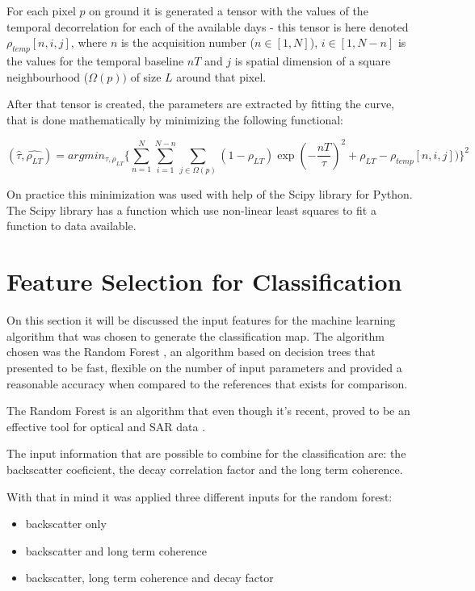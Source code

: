 For each pixel $p$ on ground it is generated a tensor with the values of the temporal decorrelation for each of the available days - this tensor is here denoted $\rho_{temp} [n, i, j]$, where $n$ is the acquisition number ($n \in [1, N]$), $i \in [1, N-n]$ is the values for the temporal baseline $nT$ and $j$ is spatial dimension of a square neighbourhood ($\Omega(p))$ of size $L$ around that pixel.

After that tensor is created, the parameters are extracted by fitting the curve, that is done mathematically by minimizing the following functional:

\begin{equation}
    (\hat{\tau}, \hat{\rho_{LT}}) = arg min_{\tau, \rho_{LT}} \{
    \sum_{n=1}^N
    \sum_{i=1}^{N-n}
    \sum_{j \in \Omega(p)}
    (1-\rho_{LT}) \exp(-\frac{nT}{\tau})^2 + \rho_{LT} - \rho_{temp}[n,i,j]) 
    \}^2
\end{equation}

On practice this minimization was used with help of the Scipy library for Python. The Scipy library has a function which use non-linear least squares to fit a function to data available. 
\section{Feature Selection for Classification}
\label{tresponto4}

On this section it will be discussed the input features for the machine learning algorithm that was chosen to generate the classification map. The algorithm chosen was the Random Forest \cite{rf}, an algorithm based on decision trees that presented to be fast, flexible on the number of input parameters and provided a reasonable accuracy when compared to the references that exists for comparison. 

The Random Forest is an algorithm that even though it's recent, proved to be an effective tool for optical and SAR data \cite{rfsar}.

The input information that are possible to combine for the classification are: the backscatter coeficient, the decay correlation factor and the long term coherence. 

With that in mind it was applied three different inputs for the random forest:

\begin{itemize}
    \item backscatter only
    \item backscatter and long term coherence
    \item backscatter, long term coherence and decay factor
\end{itemize}

